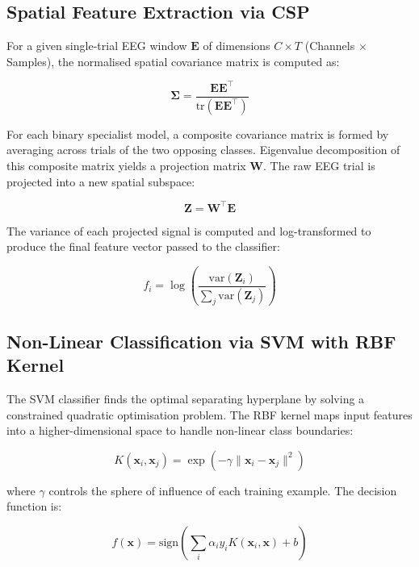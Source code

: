 \documentclass[12pt, a4paper, oneside]{report}
\begin{document}
\subsection{Spatial Feature Extraction via CSP}

For a given single-trial EEG window $\mathbf{E}$ of dimensions $C \times T$
(Channels $\times$ Samples), the normalised spatial covariance matrix is computed as:

\begin{equation}
    \mathbf{\Sigma} = \frac{\mathbf{E}\mathbf{E}^{\top}}{\mathrm{tr}(\mathbf{E}\mathbf{E}^{\top})}
\end{equation}

For each binary specialist model, a composite covariance matrix is formed by averaging
across trials of the two opposing classes. Eigenvalue decomposition of this composite
matrix yields a projection matrix $\mathbf{W}$. The raw EEG trial is projected into a
new spatial subspace:

\begin{equation}
    \mathbf{Z} = \mathbf{W}^{\top} \mathbf{E}
\end{equation}

The variance of each projected signal is computed and log-transformed to produce the
final feature vector passed to the classifier:

\begin{equation}
    f_i = \log\left(\frac{\mathrm{var}(\mathbf{Z}_i)}{\sum_j \mathrm{var}(\mathbf{Z}_j)}\right)
\end{equation}

\subsection{Non-Linear Classification via SVM with RBF Kernel}

The SVM classifier finds the optimal separating hyperplane by solving a constrained
quadratic optimisation problem. The RBF kernel maps input features into a
higher-dimensional space to handle non-linear class boundaries:

\begin{equation}
    K(\mathbf{x}_i, \mathbf{x}_j) = \exp\left(-\gamma \|\mathbf{x}_i - \mathbf{x}_j\|^2\right)
\end{equation}

where $\gamma$ controls the sphere of influence of each training example.
The decision function is:

\begin{equation}
    f(\mathbf{x}) = \mathrm{sign}\left(\sum_{i} \alpha_i y_i K(\mathbf{x}_i, \mathbf{x}) + b\right)
\end{equation}
\end{document}
